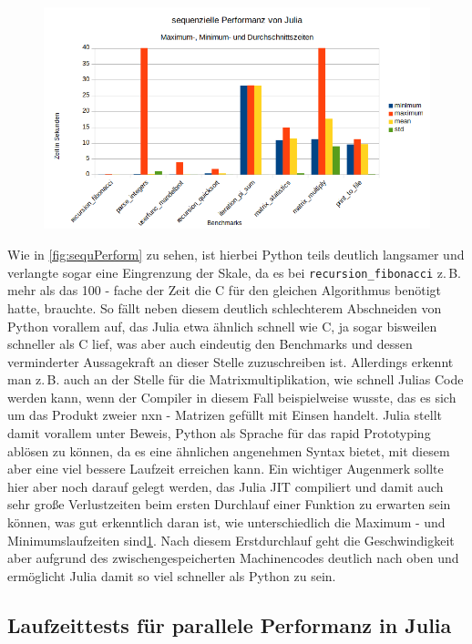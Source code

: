 \documentclass[proseminar,german,utf8]{zihpub}
\newcommand{\zB}[0]{{z.\,B. }}
\begin{document}
\begin{figure}[hbt!]
  \centering
  \includegraphics[scale=0.8]{bilder/julia_performance.png}
  \label{fig:juliaPerform}
\end{figure}

Wie in  \ref{fig:sequPerform} zu sehen, ist hierbei Python teils deutlich langsamer und verlangte sogar eine Eingrenzung der Skale, da es bei \verb|recursion_fibonacci| \zB mehr als das 100 - fache der Zeit die C für den gleichen Algorithmus benötigt hatte, brauchte. So fällt neben diesem deutlich schlechterem Abschneiden von Python vorallem auf, das Julia etwa ähnlich schnell wie C, ja sogar bisweilen schneller als C lief, was aber auch eindeutig den Benchmarks und dessen verminderter Aussagekraft an dieser Stelle zuzuschreiben ist. Allerdings erkennt man \zB auch an der Stelle für die Matrixmultiplikation, wie schnell Julias Code werden kann, wenn der Compiler in diesem Fall beispielweise wusste, das es sich um das Produkt zweier nxn - Matrizen gefüllt mit Einsen handelt. Julia stellt damit vorallem unter Beweis, Python als Sprache für das rapid Prototyping ablösen zu können, da es eine ähnlichen angenehmen Syntax bietet, mit diesem aber eine viel bessere Laufzeit erreichen kann. Ein wichtiger Augenmerk sollte hier aber noch darauf gelegt werden, das Julia JIT compiliert und damit auch sehr große Verlustzeiten beim ersten Durchlauf einer Funktion zu erwarten sein können, was gut erkenntlich daran ist, wie unterschiedlich die Maximum - und Minimumslaufzeiten sind\ref{fig:juliaPerform}.  Nach diesem Erstdurchlauf geht die Geschwindigkeit aber aufgrund des zwischengespeicherten Machinencodes deutlich nach oben und ermöglicht Julia damit so viel schneller als Python zu sein.


\subsection{Laufzeittests für parallele Performanz in Julia}
\end{document}
